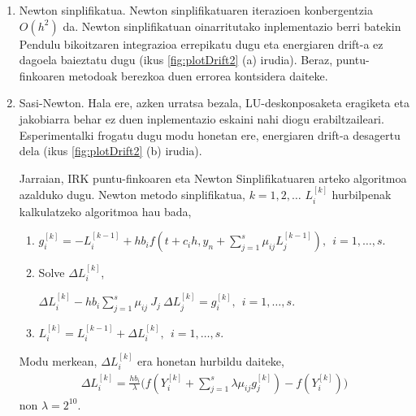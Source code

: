 \begin{enumerate}
\item Newton sinplifikatua. 
Newton sinplifikatuaren iterazioen konbergentzia $O(h^2)$ da. Newton sinplifikatuan oinarritutako inplementazio berri batekin Pendulu bikoitzaren integrazioa errepikatu dugu eta energiaren drift-a ez dagoela baieztatu dugu (ikus \ref{fig:plotDrift2} (a) irudia). Beraz, puntu-finkoaren metodoak berezkoa duen errorea kontsidera daiteke.

\item Sasi-Newton.
 Hala ere, azken urratsa bezala, LU-deskonposaketa eragiketa eta jakobiarra  behar ez duen inplementazio eskaini nahi diogu erabiltzaileari. Esperimentalki frogatu dugu modu honetan ere, energiaren drift-a desagertu dela (ikus \ref{fig:plotDrift2} (b) irudia).
 
Jarraian, IRK puntu-finkoaren eta Newton Sinplifikatuaren arteko algoritmoa azalduko dugu. Newton metodo sinplifikatua, $k=1,2,\dots$  $L_i^{[k]}$ hurbilpenak kalkulatzeko algoritmoa hau bada,
\begin{enumerate}
\item 
$g_i^{[k]}=-L_i^{[k-1]}+h b_i f(t+c_ih,y_n+ \sum\limits_{j=1}^{s} \mu_{ij} L_{j}^{[k-1]}), \ \ i=1,\dots,s.$

\item Solve $\Delta L_i^{[k]}$,

$\Delta L_i^{[k]} - h b_i \sum_{j=1}^{s} \mu_{ij} \ J_j \ \Delta L_j^{[k]} = g_i^{[k]}  , \ \ i=1,\dots,s.$

\item $L_i^{[k]} = L_i^{[k-1]}+ \Delta L_i^{[k]}, \ \  i=1,\dots,s.$

\end{enumerate}

Modu merkean, $\Delta L_i^{[k]}$ era honetan hurbildu daiteke,  
\begin{align*}
\Delta L_i^{[k]}= \frac{h b_i}{\lambda} \bigg(f(Y_{i}^{[k]}+ \sum_{j=1}^{s} \lambda \mu_{ij} g_j^{[k]})-f(Y_{i}^{[k]}) \bigg)
\end{align*}
non $\lambda=2^{10}$.

\end{enumerate}


